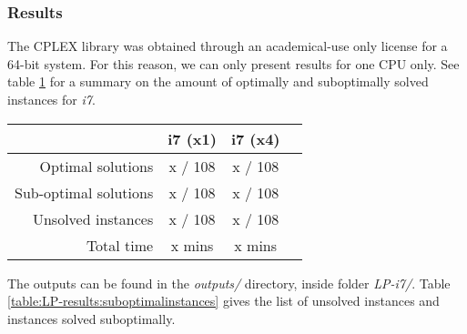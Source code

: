 \subsubsection{Results}
\label{sec:benchmarking:linear-programming:results}

The CPLEX library was obtained through an academical-use only license for a 64-bit system.
For this reason, we can only present results for one CPU only. See table \ref{table:LP-results}
for a summary on the amount of optimally and suboptimally solved instances for \textit{i7}.

\begin{table}[H]
\centering
	\begin{tabular}{rccc}
								& i7 (x1)	& i7 (x4) \\
		\midrule
		Optimal solutions		& x / 108	& x / 108 \\
		Sub-optimal solutions	& x / 108	& x / 108 \\
		Unsolved instances		& x / 108	& x / 108 \\
		Total time				& x mins		& x mins \\
	\end{tabular}
	\label{table:LP-results}
\end{table}

The outputs can be found in the \textit{outputs/} directory, inside folder
\textit{LP-i7/}. Table \ref{table:LP-results:suboptimalinstances}
gives the list of unsolved instances and instances solved suboptimally.

